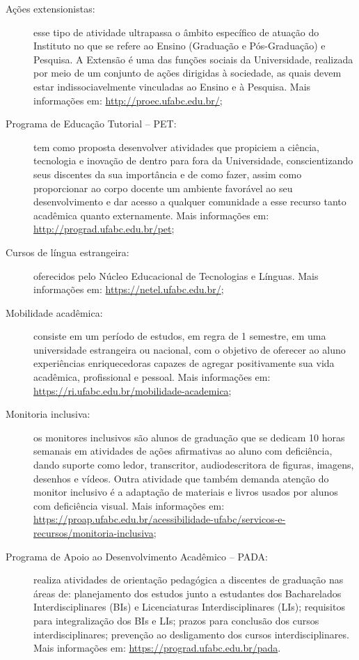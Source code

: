 \begin{description}
    \item[Ações extensionistas:] esse tipo de atividade ultrapassa o âmbito
    específico de atuação do Instituto no que se refere ao Ensino (Graduação e
    Pós-Graduação) e Pesquisa. A Extensão é uma das funções sociais da
    Universidade, realizada por meio de um conjunto de ações dirigidas à
    sociedade, as quais devem estar indissociavelmente vinculadas ao Ensino e à
    Pesquisa.
    Mais informações em: \url{http://proec.ufabc.edu.br/};

    \item[Programa de Educação Tutorial -- PET:] tem como proposta desenvolver
    atividades que propiciem a ciência, tecnologia e inovação de dentro para
    fora da Universidade, conscientizando seus discentes da sua importância e
    de como fazer, assim como proporcionar ao corpo docente um ambiente
    favorável ao seu desenvolvimento e dar acesso a qualquer comunidade a esse
    recurso tanto acadêmica quanto externamente.
    Mais informações em:
    \url{http://prograd.ufabc.edu.br/pet};

    \item[Cursos de língua estrangeira:] oferecidos pelo Núcleo Educacional de
    Tecnologias e Línguas. Mais informações em:
    \url{https://netel.ufabc.edu.br/};

    \item[Mobilidade acadêmica:] consiste em um período de estudos, em regra de
    1 semestre, em uma universidade estrangeira ou nacional, com o objetivo de
    oferecer ao aluno experiências enriquecedoras capazes de agregar
    positivamente sua vida acadêmica, profissional e pessoal.
    Mais informações em: \url{https://ri.ufabc.edu.br/mobilidade-academica};

    \item[Monitoria inclusiva:] os monitores inclusivos são alunos de graduação
    que se dedicam 10 horas semanais em atividades de ações afirmativas ao
    aluno com deficiência, dando suporte como ledor, transcritor,
    audiodescritora de figuras, imagens, desenhos e vídeos. Outra atividade que
    também demanda atenção do monitor inclusivo é a adaptação de materiais e
    livros usados por alunos com deficiência visual.
    Mais informações em:
    \url{https://proap.ufabc.edu.br/acessibilidade-ufabc/servicos-e-recursos/monitoria-inclusiva};

    \item[Programa de Apoio ao Desenvolvimento Acadêmico -- PADA:] realiza
    atividades de orientação pedagógica a discentes de graduação nas áreas de:
    planejamento dos estudos junto a estudantes dos Bacharelados
    Interdisciplinares (BIs) e Licenciaturas Interdisciplinares (LIs);
    requisitos para integralização dos BIs e LIs; prazos para conclusão dos
    cursos interdisciplinares; prevenção ao desligamento dos cursos
    interdisciplinares.
    Mais informações em: \url{https://prograd.ufabc.edu.br/pada}.
\end{description}
